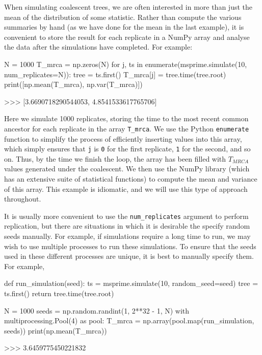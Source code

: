 \documentclass[graybox]{svmult}
\begin{document}
When simulating coalescent trees, we are often interested in more than
just the mean of the distribution of some statistic. Rather than compute
the various summaries by hand (as we have done for the mean in the last
example), it is convenient to store the result for each
replicate in a NumPy array and analyse the data after the simulations have completed.
For example:

\begin{pythoncode}
N = 1000
T_mrca = np.zeros(N)
for j, ts in enumerate(msprime.simulate(10, num_replicates=N)):
    tree = ts.first()
    T_mrca[j] = tree.time(tree.root)
print([np.mean(T_mrca), np.var(T_mrca)])

>>> [3.6690718290544053, 4.8541533617765706]
\end{pythoncode}

    Here we simulate 1000 replicates, storing the time to the most recent
common ancestor for each replicate in the array \texttt{T\_mrca}.  We use the Python \texttt{enumerate} function to simplify the process of efficiently inserting values into this
array, which simply ensures that \texttt{j} is \texttt{0} for the first replicate,
\texttt{1} for the second, and so on. Thus, by the time we finish the
loop, the array has been filled with $T_{MRCA}$ values generated
under the coalescent. We then use the NumPy library (which has
an extensive suite of statistical functions) to compute the mean and
variance of this array. This example is idiomatic, and we will use this
type of approach throughout.

It is usually more convenient to use the \texttt{num\_replicates}
argument to perform replication, but there are situations in which it is
desirable the specify random seeds manually. For example, if simulations
require a long time to run, we may wish to use multiple processes to
run these simulations. To ensure that the seeds used in these different
processes are unique, it is best to manually specify them. For example,

\begin{pythoncode}
def run_simulation(seed):
    ts = msprime.simulate(10, random_seed=seed)
    tree = ts.first()
    return tree.time(tree.root)

N = 1000
seeds = np.random.randint(1, 2**32 - 1, N)
with multiprocessing.Pool(4) as pool:
    T_mrca = np.array(pool.map(run_simulation, seeds))
print(np.mean(T_mrca))

>>> 3.6459775450221832
\end{pythoncode}
\end{document}
